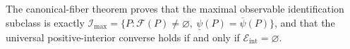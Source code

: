The canonical-fiber theorem proves that the maximal observable identification subclass is exactly \(\mathcal I_{\max}=\{P:\mathcal F(P)\neq\varnothing,\ \underline\psi(P)=\overline\psi(P)\}\), and that the universal positive-interior converse holds if and only if \(\mathcal E_{\mathrm{int}}=\varnothing\).